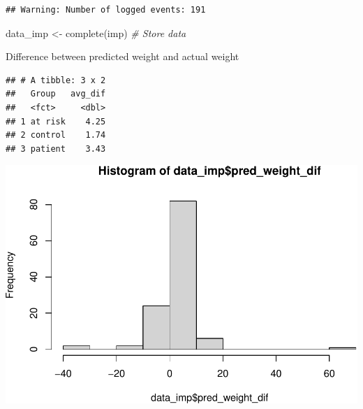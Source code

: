 \documentclass[
]{article}
\newenvironment{Shaded}{\begin{snugshade}}{\end{snugshade}}
\newcommand{\AttributeTok}[1]{\textcolor[rgb]{0.77,0.63,0.00}{#1}}
\newcommand{\CommentTok}[1]{\textcolor[rgb]{0.56,0.35,0.01}{\textit{#1}}}
\newcommand{\FloatTok}[1]{\textcolor[rgb]{0.00,0.00,0.81}{#1}}
\newcommand{\FunctionTok}[1]{\textcolor[rgb]{0.00,0.00,0.00}{#1}}
\newcommand{\NormalTok}[1]{#1}
\newcommand{\OtherTok}[1]{\textcolor[rgb]{0.56,0.35,0.01}{#1}}
\newcommand{\SpecialCharTok}[1]{\textcolor[rgb]{0.00,0.00,0.00}{#1}}
\begin{document}
\begin{verbatim}
## Warning: Number of logged events: 191
\end{verbatim}

\begin{Shaded}
\begin{Highlighting}[]
\NormalTok{data\_imp }\OtherTok{\textless{}{-}} \FunctionTok{complete}\NormalTok{(imp) }\CommentTok{\# Store data}
\end{Highlighting}
\end{Shaded}

Difference between predicted weight and actual weight

\begin{Shaded}
\end{Shaded}

\begin{verbatim}
## # A tibble: 3 x 2
##   Group   avg_dif
##   <fct>     <dbl>
## 1 at risk    4.25
## 2 control    1.74
## 3 patient    3.43
\end{verbatim}

\begin{Shaded}
\end{Shaded}

\includegraphics{046_weight_history_alpha_files/figure-latex/unnamed-chunk-15-1.pdf}
\end{document}
